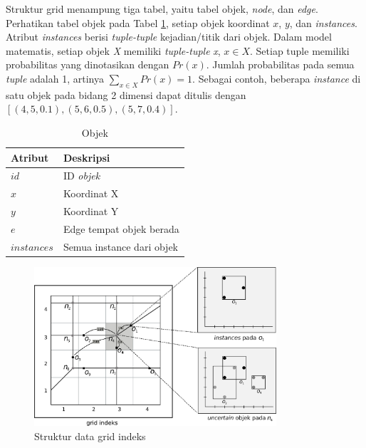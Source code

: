 \documentclass[conference]{IEEEtran}
\begin{document}
Struktur grid menampung tiga tabel, yaitu tabel objek, \textit{node}, dan \textit{edge}. Perhatikan tabel objek pada Tabel \ref{tab:objek}, setiap objek koordinat $ x $, $ y $, dan \textit{instances}. Atribut \textit{instances} berisi \textit{tuple-tuple} kejadian/titik dari objek. Dalam model matematis, setiap objek \textit{X} memiliki \textit{tuple-tuple} \textit{x}, $ x \in X $. Setiap tuple memiliki probabilitas yang dinotasikan dengan $ Pr(x) $. Jumlah probabilitas pada semua \textit{tuple} adalah 1, artinya $ \sum_{x \in X} Pr(x) = 1 $. Sebagai contoh, beberapa \textit{instance} di satu objek pada bidang 2 dimensi dapat ditulis dengan $ [(4, 5, 0.1), (5, 6, 0.5), (5, 7, 0.4)] $.

\begin{table}[htbp]
	\caption{Objek}
	\begin{center}
		\begin{tabular}{| p{2cm} | p{5cm} |}
			\hline
			\textbf{Atribut} & \textbf{Deskripsi} \\ \hline
			$ id $ & ID \textit{objek} \\ \hline
			$ x $ & Koordinat X \\ \hline
			$ y $ & Koordinat Y \\ \hline
			$ e $ & Edge tempat objek berada \\ \hline
			$ instances $ & Semua instance dari objek \\
			\hline
		\end{tabular}
		\label{tab:objek}
	\end{center}
\end{table}

\begin{figure}[H]
	\centering
	\includegraphics[width=9cm]{img/struktur-data.png}
	\caption{Struktur data grid indeks}
	\label{fig:grid}
\end{figure}
\end{document}
